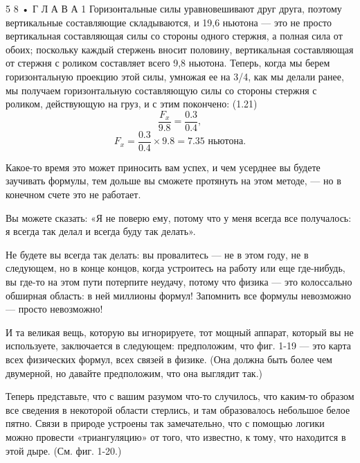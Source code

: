 \documentclass[10pt,oneside]{article}
\newcommand{\TipsSubsection}[1]{\par\vspace{6bp}{\normalsize\bfseries #1\par}\vspace{2bp}}
\begin{document}
5 8 • Г Л А В А  1 Горизонтальные силы уравновешивают друг друга, поэтому вертикальные составляющие складываются, и 19,6 ньютона --- это не просто вертикальная составляющая силы со стороны одного стержня, а полная сила от обоих; поскольку каждый стержень вносит половину, вертикальная составляющая от стержня с роликом составляет всего 9,8 ньютона. Теперь, когда мы берем горизонтальную проекцию этой силы, умножая ее на 3/4, как мы делали ранее, мы получаем горизонтальную составляющую силы со стороны стержня с роликом, действующую на груз, и с этим покончено: (1.21) \[\frac{F_x}{9.8} = \frac{0.3}{0.4},\] \[F_x = \frac{0.3}{0.4} \times 9.8 = 7.35 \text{ ньютона}.\]\par

\TipsSubsection{1-10 Триангуляция У меня осталось еще несколько минут, поэтому мне хотелось бы сказать пару слов о связи математики с физикой --- связи, которая, собственно, была хорошо проиллюстрирована этим простым примером. Бесполезно просто заучивать формулы и говорить себе: «Я знаю все формулы; мне нужно лишь сообразить, как подставить их в задачу!»}

Какое-то время это может приносить вам успех, и чем усерднее вы будете заучивать формулы, тем дольше вы сможете протянуть на этом методе, --- но в конечном счете это не работает.\par

Вы можете сказать: «Я не поверю ему, потому что у меня всегда все получалось: я всегда так делал и всегда буду так делать».\par

Не будете вы всегда так делать: вы провалитесь --- не в этом году, не в следующем, но в конце концов, когда устроитесь на работу или еще где-нибудь, вы где-то на этом пути потерпите неудачу, потому что физика --- это колоссально обширная область: в ней миллионы формул! Запомнить все формулы невозможно --- просто невозможно!\par

И та великая вещь, которую вы игнорируете, тот мощный аппарат, который вы не используете, заключается в следующем: предположим, что фиг. 1-19 --- это карта всех физических формул, всех связей в физике. (Она должна быть более чем двумерной, но давайте предположим, что она выглядит так.)\par

Теперь представьте, что с вашим разумом что-то случилось, что каким-то образом все сведения в некоторой области стерлись, и там образовалось небольшое белое пятно. Связи в природе устроены так замечательно, что с помощью логики можно провести «триангуляцию» от того, что известно, к тому, что находится в этой дыре. (См. фиг. 1-20.)\par
\end{document}
